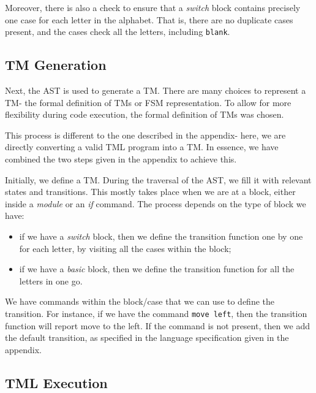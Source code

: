 Moreover, there is also a check to ensure that a \textit{switch} block contains precisely one case for each letter in the alphabet. That is, there are no duplicate cases present, and the cases check all the letters, including \texttt{blank}.




\subsection{TM Generation}
Next, the AST is used to generate a TM. There are many choices to represent a TM- the formal definition of TMs or FSM representation. To allow for more flexibility during code execution, the formal definition of TMs was chosen. 

This process is different to the one described in the appendix- here, we are directly converting a valid TML program into a TM. In essence, we have combined the two steps given in the appendix to achieve this.

Initially, we define a TM. During the traversal of the AST, we fill it with relevant states and transitions. This mostly takes place when we are at a block, either inside a \textit{module} or an \textit{if} command. The process depends on the type of block we have:
\begin{itemize}
    \item if we have a \textit{switch} block, then we define the transition function one by one for each letter, by visiting all the cases within the block;
    \item if we have a \textit{basic} block, then we define the transition function for all the letters in one go.
\end{itemize}
We have commands within the block/case that we can use to define the transition. For instance, if we have the command \texttt{move left}, then the transition function will report move to the left. If the command is not present, then we add the default transition, as specified in the language specification given in the appendix.

\subsection{TML Execution}

